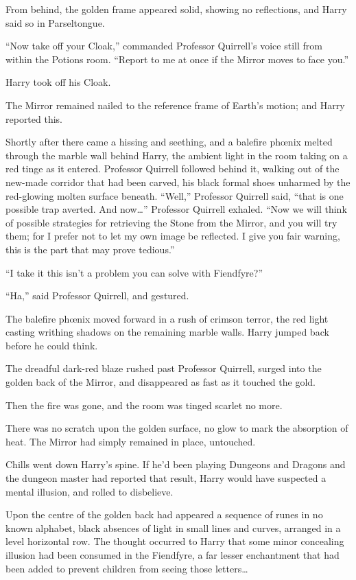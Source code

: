 From behind, the golden frame appeared solid, showing no reflections, and Harry said so in Parseltongue.

“Now take off your Cloak,” commanded Professor Quirrell’s voice still from within the Potions room. “Report to me at once if the Mirror moves to face you.”

Harry took off his Cloak.

The Mirror remained nailed to the reference frame of Earth’s motion; and Harry reported this.

Shortly after there came a hissing and seething, and a balefire phœnix melted through the marble wall behind Harry, the ambient light in the room taking on a red tinge as it entered. Professor Quirrell followed behind it, walking out of the new-made corridor that had been carved, his black formal shoes unharmed by the red-glowing molten surface beneath. “Well,” Professor Quirrell said, “that is one possible trap averted. And now…” Professor Quirrell exhaled. “Now we will think of possible strategies for retrieving the Stone from the Mirror, and you will try them; for I prefer not to let my own image be reflected. I give you fair warning, this is the part that may prove tedious.”

“I take it this isn’t a problem you can solve with Fiendfyre?”

“Ha,” said Professor Quirrell, and gestured.

The balefire phœnix moved forward in a rush of crimson terror, the red light casting writhing shadows on the remaining marble walls. Harry jumped back before he could think.

The dreadful dark-red blaze rushed past Professor Quirrell, surged into the golden back of the Mirror, and disappeared as fast as it touched the gold.

Then the fire was gone, and the room was tinged scarlet no more.

There was no scratch upon the golden surface, no glow to mark the absorption of heat. The Mirror had simply remained in place, untouched.

Chills went down Harry’s spine. If he’d been playing Dungeons and Dragons and the dungeon master had reported that result, Harry would have suspected a mental illusion, and rolled to disbelieve.

Upon the centre of the golden back had appeared a sequence of runes in no known alphabet, black absences of light in small lines and curves, arranged in a level horizontal row. The thought occurred to Harry that some minor concealing illusion had been consumed in the Fiendfyre, a far lesser enchantment that had been added to prevent children from seeing those letters…


